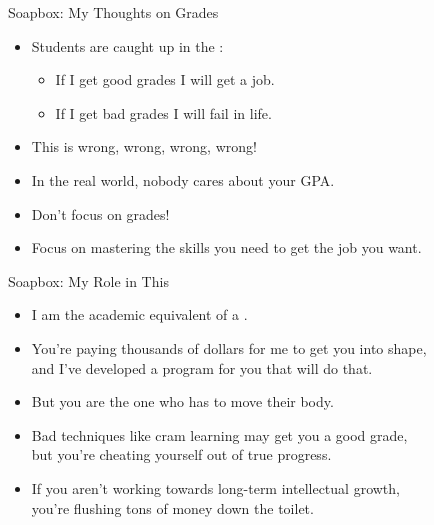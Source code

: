 \documentclass[professionalfonts, xcolor={usenames,svgnames,x11names,table}]{beamer}
\begin{document}
\begin{frame}{Soapbox: My Thoughts on Grades}
    \begin{itemize}
        \item Students are caught up in the :
            \begin{itemize}
                \item If I get good grades I will get a job.
                \item If I get bad grades I will fail in life.
            \end{itemize}
        \item This is wrong, wrong, wrong, wrong!
        \item In the real world, nobody cares about your GPA.
        \item Don't focus on grades!
        \item Focus on mastering the skills you need to get the job you want.
    \end{itemize}
\end{frame}

\begin{frame}{Soapbox: My Role in This}
    \begin{itemize}
        \item I am the academic equivalent of a .
        \item You're paying thousands of dollars for me to get you into shape,\\ and I've developed a program for you that will do that.
        \item But you are the one who has to move their body.
        \item Bad techniques like cram learning may get you a good grade,\\
              but you're cheating yourself out of true progress.
        \item If you aren't working towards long-term intellectual growth,\\
            you're flushing tons of money down the toilet.
    \end{itemize}
\end{frame}
\end{document}
